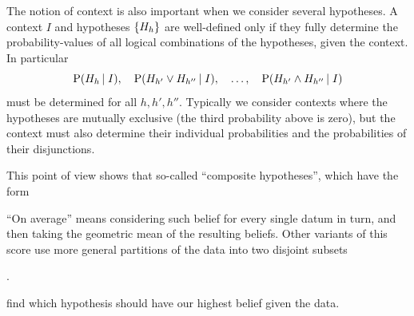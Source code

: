 \documentclass[\ifafour a4paper,12pt,\else a5paper,10pt,\fi%
onecolumn,oneside,article,%
british%
]{memoir}
\theoremstyle{remark}
\theoremstyle{innote}
\newcommand*{\defd}{\coloneqq}
\DeclarePairedDelimiter\set{\{}{\}}
\newcommand*{\p}{\mathrm{P}}%
\renewcommand*{\|}[1][]{\nonscript\,#1\vert\nonscript\;\mathopen{}}
\newcommand*{\prop}[1]{\text{\textquoteleft}#1\text{\textquoteright}}
\newcommand*{\yK}{I}
\newcommand*{\eq}{\mathrel{\!=\!}}
\begin{document}
The notion of context is also important when we consider several
hypotheses. A context $\yK$ and hypotheses $\set{H_{h}}$ are well-defined
only if they fully determine the probability-values of all logical
combinations of the hypotheses, given the context. In particular
\begin{equation}
  \label{eq:conj_hyp}
 \p( H_{h} \| \yK),
 \quad
 \p( H_{h'} \lor H_{h''} \| \yK),
 \quad \dotsc, \quad
  \p( H_{h'} \land H_{h''} \| \yK)
\end{equation}
must be determined for all $h,h',h''$. Typically we consider contexts where
the hypotheses are mutually exclusive (the third probability above is
zero), but the context must also determine their individual probabilities
and the probabilities of their disjunctions.





This point of view shows that so-called \enquote{composite hypotheses},
which have the form










\enquote{On average} means considering such belief for every single datum
in turn, and then taking the geometric mean of the resulting
beliefs. %
Other variants of this score use more general partitions of the data into
two disjoint subsets\addtocounter{footnote}{-1}\footnotemark{}.



find which hypothesis should have our highest belief
given the data.
\end{document}
